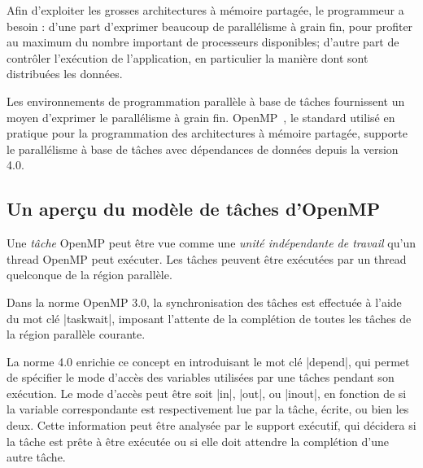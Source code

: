 \documentclass[parallelisme]{compas2016}
\begin{document}
Afin d'exploiter les grosses architectures à mémoire partagée, le programmeur a besoin :
d'une part d'exprimer beaucoup de parallélisme à grain fin, pour profiter au
maximum du nombre important de processeurs disponibles; d'autre part de contrôler
l'exécution de l'application, en particulier la manière dont sont distribuées
les données.

Les environnements de programmation parallèle à base de tâches fournissent un moyen
d'exprimer le parallélisme à grain fin. OpenMP~\cite{openmp40}, le standard utilisé
en pratique pour la programmation des architectures à mémoire partagée, supporte
le parallélisme à base de tâches avec dépendances de données depuis la version 4.0.

\subsection{Un aperçu du modèle de tâches d'OpenMP}

Une \emph{tâche} OpenMP peut être vue comme une \emph{unité indépendante de travail} qu'un thread
OpenMP peut exécuter. Les tâches peuvent être exécutées par un thread quelconque
de la région parallèle.

Dans la norme OpenMP 3.0, la synchronisation des tâches est effectuée à l'aide du
mot clé |taskwait|, imposant l'attente de la complétion de toutes les tâches
de la région parallèle courante.

La norme 4.0 enrichie ce concept en introduisant le mot clé |depend|, qui permet
de spécifier le mode d'accès des variables utilisées par une tâches pendant son exécution.
Le mode d'accès peut être soit |in|, |out|, ou |inout|, en fonction de si la
variable correspondante est respectivement lue par la tâche, écrite, ou bien les deux.
Cette information peut être analysée par le support exécutif, qui décidera si
la tâche est prête à être exécutée ou si elle doit attendre la complétion d'une
autre tâche.



\end{document}
